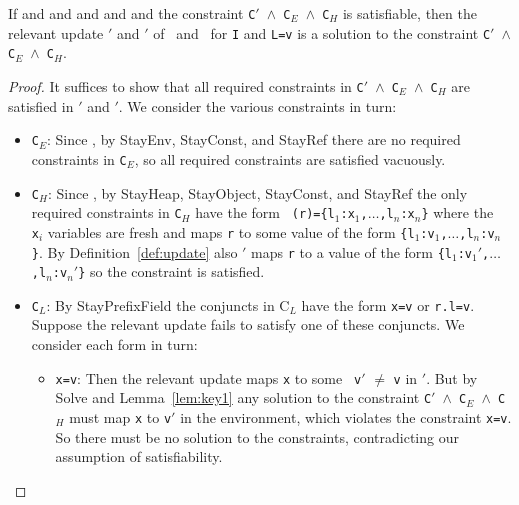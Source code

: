 \begin{Lemma}
\label{lem:relevantSolution}
If    \emph{} and
    \emph{} and
\emph{} and
\emph{} and
    \emph{}
    and the constraint {\tt C$'$ $\wedge$ C$_{E}$ $\wedge$ C$_{H}$} is satisfiable,
then the 
relevant update {\tt \Euid$'$} and {\tt \Huid$'$} of \Euid\ and \Huid\ for {\tt I} and {\tt L=v} 
is a solution to the constraint {\tt C$'$ $\wedge$ C$_{E}$ $\wedge$ C$_{H}$}.
\end{Lemma}
\begin{proof}
It suffices to show that all required constraints in {\tt C$'$
  $\wedge$ C$_{E}$ $\wedge$ C$_{H}$} are satisfied in  {\tt \Euid$'$}
and {\tt \Huid$'$}.  We consider the various constraints in
turn:
\begin{itemize}
\item {\tt C$_E$}:  Since , by {\sc
    StayEnv}, {\sc StayConst}, and {\sc StayRef} there are no required
  constraints in {\tt C$_E$}, so all required constraints are
  satisfied vacuously.

\item {\tt C$_H$}:  Since , by {\sc
    StayHeap}, {\sc StayObject}, {\sc StayConst}, and {\sc StayRef}
  the only required
  constraints in {\tt C$_H$} have the form {\tt
    \Deref(r)=\{l$_1$:x$_1$,$\ldots$,l$_n$:x$_n$\}} where the {\tt
    x$_i$} variables are fresh and {\tt \Huid} maps {\tt r} to some value of the
  form {\tt \{l$_1$:v$_1$,$\ldots$,l$_n$:v$_n$\}}.  By
  Definition~\ref{def:update} also {\tt \Huid$'$} maps {\tt r} to a value of the
  form {\tt \{l$_1$:v$_1'$,$\ldots$,l$_n$:v$_n'$\}} so the constraint
  is satisfied.

\item {\tt C$_L$}:  By {\sc StayPrefixField} the conjuncts in C$_L$
  have the form {\tt x=v} or {\tt r.l=v}.  Suppose the relevant update fails to
  satisfy one of these conjuncts.  We consider each form in turn:
\begin{itemize}
\item {\tt x=v}:  Then the relevant update maps {\tt x} to some {\tt
    v$'$} $\neq$ {\tt v} in {\tt \Euid$'$}.  But by {\sc Solve} and
  Lemma~\ref{lem:key1} any solution to  the constraint {\tt C$'$
    $\wedge$ C$_{E}$ $\wedge$ C$_{H}$} must map {\tt x} to {\tt v$'$}
  in the environment, which violates the constraint {\tt x=v}.  So there must be no solution to the constraints,
  contradicting our assumption of satisfiability.


\end{itemize}
\end{itemize}
\end{proof}
